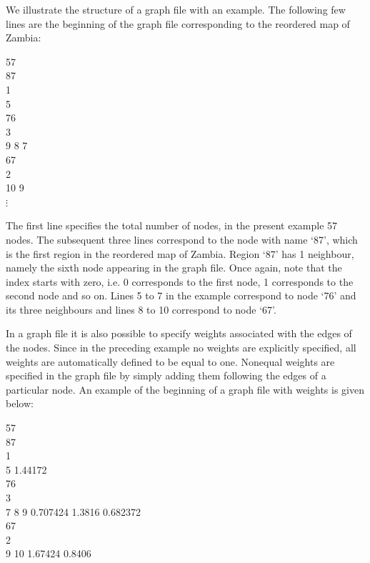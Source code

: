 We illustrate the structure of a graph file with an example. The following few lines are the beginning of the graph file
corresponding to the reordered map of Zambia:

\footnotesize

 57\\
 87\\
 1\\
 5\\
 76\\
 3\\
 9 8 7\\
 67\\
 2\\
 10 9\\

\hspace{1cm} $\vdots$

\normalsize

\vspace{0.5cm}

The first line specifies the total number of nodes, in the present example 57 nodes. The subsequent three lines correspond to
the node with name `87', which is the first region in the reordered map of Zambia. Region `87' has 1 neighbour, namely the
sixth node appearing in the graph file. Once again, note that the index starts with zero, i.e. 0 corresponds to the first node,
1 corresponds to the second node and so on. Lines 5 to 7 in the example correspond to node `76' and its three neighbours and
lines 8 to 10 correspond to node `67'.

In a graph file it is also possible to specify weights associated with the edges of the nodes. Since in the preceding example
no weights are explicitly specified, all weights are automatically defined to be equal to one. Nonequal weights are specified
in the graph file by simply adding them following the edges of a particular node. An example of the beginning of a graph file
with weights is given below:

\footnotesize

 57\\
 87\\
 1\\
 5 1.44172\\
 76\\
 3\\
 7 8 9 0.707424 1.3816 0.682372\\
 67\\
 2\\
 9 10 1.67424 0.8406\\

